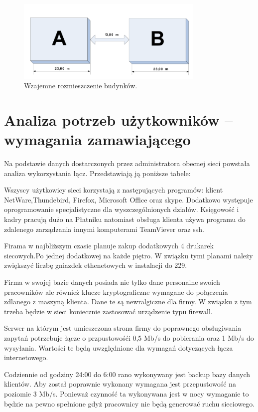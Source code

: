 \documentclass{report}
\begin{document}
\begin{figure}[h!]
  \centering
      \includegraphics[width=0.8\textwidth]{./obrazki/rozmieszczenie_budynkow.jpeg}
  \caption{Wzajemne rozmieszczenie budynków.}
\end{figure}



\chapter{Analiza potrzeb użytkowników – wymagania zamawiającego}
Na podstawie danych dostarczonych przez administratora obecnej sieci powstała analiza wykorzystania łącz. Przedstawiają ją poniższe tabele:


Wszyscy użytkowicy sieci korzystają z następujących programów: klient NetWare,Thundebird, Firefox, Microsoft Office oraz skype. Dodatkowo występuje 
oprogramowanie specjalistyczne dla wyszczególnionych działów. Księgowość i kadry pracują dużo na Płatniku natomiast obsługa klienta używa programu
do zdalenego zarządzania innymi komputerami TeamViever oraz ssh.

Firama w najbliższym czasie planuje zakup dodatkowych 4 drukarek siecowych.Po jednej dodatkowej na każde piętro.
W związku tymi planami należy zwiększyć liczbę gniazdek ethenetowych w instalacji do 229.

Firma w swojej bazie danych posiada nie tylko dane personalne swoich pracowników ale również klucze kryptograficzne wymagane do połączenia zdlanego
z maszyną klienta. Dane te są newralgiczne dla firmy. W związku z tym trzeba będzie w sieci koniecznie zastosować urządzenie typu firewall.

Serwer na którym jest umieszczona strona firmy do poprawnego obsługiwania zapytań potrzebuje łącze o przpustowośći 0,5 Mb/s do pobierania oraz
1 Mb/s do wysyłania. Wartości te będą uwzględnione dla wymagań dotyczących łącza internetowego.

Codziennie od godziny 24:00 do 6:00 rano wykonywany jest backup bazy danych klientów. Aby został poprawnie wykonany wymagana jest przepustowość 
na poziomie 3 Mb/s. Ponieważ czynność ta wykonywana jest w nocy wymaganie to będzie na pewno spełnione gdyż pracownicy nie będą generować ruchu
sieciowego.
\end{document}
